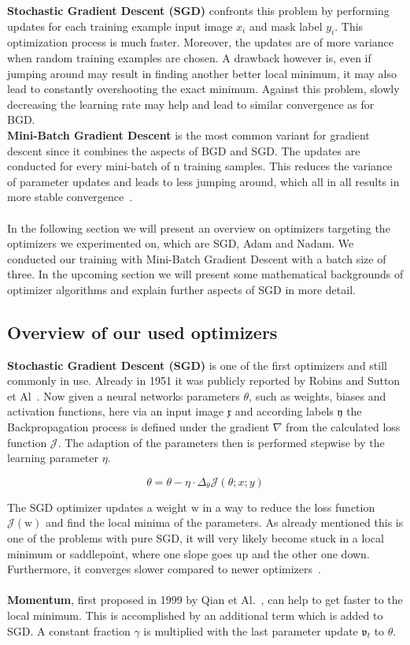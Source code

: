 \textbf{Stochastic Gradient Descent (SGD)} confronts this problem by performing updates for each training example input image $x_i$
and mask label $y_i$.
This optimization process is much faster.
Moreover, the updates are of more variance when random training examples are chosen.
A drawback however is, even if jumping around may result in finding another better local minimum, it may also
lead to constantly overshooting the exact minimum.
Against this problem, slowly decreasing the learning rate may help and lead to similar convergence as for BGD.\\
\textbf{Mini-Batch Gradient Descent} is the most common variant for gradient descent since it combines the aspects of
BGD and SGD.
The updates are conducted for every mini-batch of n training samples.
This reduces the variance of parameter updates and leads to less jumping around, which all in all results in more stable
convergence~\cite{optimizersoverview}.
\\\mbox{}\\
In the following section we will present an overview on optimizers targeting the optimizers we experimented on, which are
SGD, Adam and Nadam.
We conducted our training with Mini-Batch Gradient Descent with a batch size of three.
In the upcoming section we will present some mathematical backgrounds of optimizer algorithms and explain further aspects of
SGD in more detail.

\subsection*{Overview of our used optimizers}
%
\textbf{Stochastic Gradient Descent (SGD)} is one of the first optimizers and still commonly in use.
Already in 1951 it was publicly reported by Robins and Sutton et Al~\cite{sgd}.
Now given a neural networks parameters $\theta$, such as weights, biases and activation functions, here via an input image
$\mathfrak{x}$ and according labels $\mathfrak{y}$ the Backpropagation process is defined under the gradient $\nabla$
from the calculated loss function $\mathcal{J}$.
The adaption of the parameters then is performed stepwise by the learning parameter $\eta$.


\begin{equation}
    \theta = \theta - \eta\cdot\Delta_\theta\mathcal{J}(\theta;x;y)
    \label{eqn:sgd}
\end{equation}

The SGD optimizer updates a weight $\mathrm{w}$ in a way to reduce the loss function $\mathcal{J}(\mathrm{w})$ and find
the local minima of the parameters.
As already mentioned this is one of the problems with pure SGD, it will very likely become stuck in a local minimum or
saddlepoint, where one slope goes up and the other one down.
Furthermore, it converges slower compared to newer optimizers~\cite{optimizersoverview, optimizersexplained}.
\\\mbox{}\\
\textbf{Momentum}, first proposed in 1999 by Qian et Al.~\cite{momentum}, can help to get faster to the local minimum.
This is accomplished by an additional term which is added to SGD.
A constant fraction $\gamma$ is multiplied with the last parameter update $\mathfrak{v}_t$ to $\theta$.

